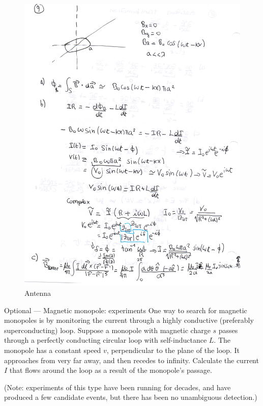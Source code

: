 \documentclass[makesolutionspdf]{esg8022pset}
\begin{document}
\begin{solution}
 \begin{figure}[H]
    \centering
    \includegraphics[width = 15cm]{antenna_sol}
    \caption{Antenna}
\end{figure}
\end{solution}


\begin{problem}{Optional --- Magnetic monopole: experiments}
  One way to search for magnetic monopoles is by monitoring the current through a highly conductive (preferably superconducting) loop. Suppose a monopole with magnetic charge $s$ passes through a perfectly conducting circular loop with self-inductance $L$. The monopole has a constant speed $v$, perpendicular to the plane of the loop. It approaches from very far away, and then recedes to infinity. Calculate the current $I$ that flows around the loop as a result of the monopole's passage.
  
  \noindent (Note: experiments of this type have been running for decades, and have produced a few candidate events, but there has been no unambiguous detection.)
\end{problem}
\end{document}
